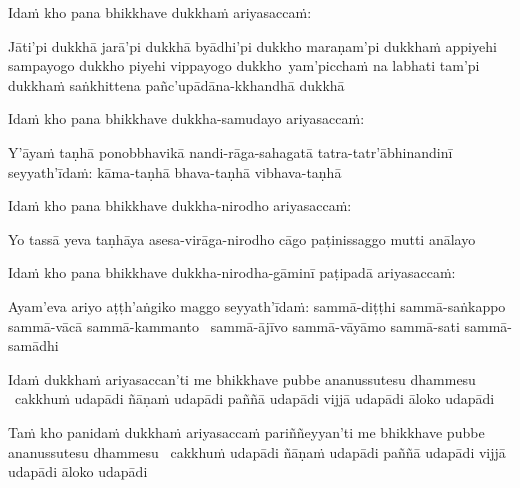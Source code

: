 \begin{pali-hang}
  Idaṁ kho pana bhikkhave dukkhaṁ ariyasaccaṁ:
\end{pali-hang}

\begin{pali-hang}
  Jāti'pi dukkhā jarā'pi dukkhā byādhi'pi dukkho maraṇam'pi dukkhaṁ \breathmark \thinspace appiyehi sampayogo dukkho piyehi vippayogo \mbox{dukkho}~\breathmark \thinspace yam'picchaṁ na labhati tam'pi dukkhaṁ  saṅkhittena pañc'upādāna-kkhandhā dukkhā
\end{pali-hang}

\begin{pali-hang}
  Idaṁ kho pana bhikkhave dukkha-samudayo ariyasaccaṁ:
\end{pali-hang}

\begin{pali-hang}
  Y'āyaṁ taṇhā ponobbhavikā nandi-rāga-sahagatā  tatra-tatr'ābhinandinī seyyath'īdaṁ: kāma-taṇhā bhava-taṇhā vibhava-taṇhā
\end{pali-hang}

\begin{pali-hang}
  Idaṁ kho pana bhikkhave dukkha-nirodho ariyasaccaṁ:
\end{pali-hang}

\begin{pali-hang}
  Yo tassā yeva taṇhāya asesa-virāga-nirodho cāgo paṭinissaggo mutti anālayo
\end{pali-hang}

\begin{pali-hang}
  Idaṁ kho pana bhikkhave dukkha-nirodha-gāminī paṭipadā ariyasaccaṁ:
\end{pali-hang}

\begin{pali-hang}
  Ayam'eva ariyo aṭṭh'aṅgiko maggo seyyath'īdaṁ: sammā-diṭṭhi sammā-saṅkappo sammā-vācā sammā-kammanto \breathmark\ sammā-ājīvo sammā-vāyāmo sammā-sati sammā-samādhi
\end{pali-hang}

\begin{pali-hang}
  Idaṁ dukkhaṁ ariyasaccan'ti me bhikkhave pubbe ananussutesu dhammesu \breathmark\ cakkhuṁ udapādi ñāṇaṁ udapādi paññā udapādi vijjā udapādi āloko udapādi
\end{pali-hang}

\begin{pali-hang}
  Taṁ kho panidaṁ dukkhaṁ ariyasaccaṁ pariññeyyan'ti me bhikkhave pubbe ananussutesu dhammesu \breathmark\ cakkhuṁ udapādi ñāṇaṁ udapādi paññā udapādi vijjā udapādi āloko udapādi
\end{pali-hang}

